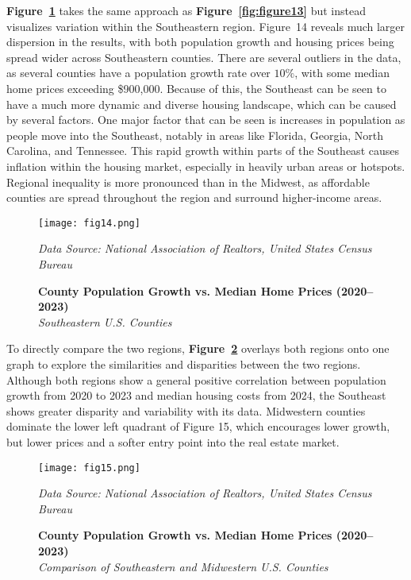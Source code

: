 \documentclass[journal,article,submit,pdftex,moreauthors]{Definitions/mdpi}
\begin{document}
\textbf{Figure~\ref{fig:figure14}} takes the same approach as \textbf{Figure~\ref{fig:figure13}} but instead visualizes variation within the Southeastern region. Figure~14 reveals much larger dispersion in the results, with both population growth and housing prices being spread wider across Southeastern counties. There are several outliers in the data, as several counties have a population growth rate over $10\%$, with some median home prices exceeding \$900{,}000. Because of this, the Southeast can be seen to have a much more dynamic and diverse housing landscape, which can be caused by several factors. One major factor that can be seen is increases in population as people move into the Southeast, notably in areas like Florida, Georgia, North Carolina, and Tennessee. This rapid growth within parts of the Southeast causes inflation within the housing market, especially in heavily urban areas or hotspots. Regional inequality is more pronounced than in the Midwest, as affordable counties are spread throughout the region and surround higher-income areas.

\begin{figure}[H]
  \centering
  \texttt{[image: fig14.png]}
  \caption{\textbf{County Population Growth vs. Median Home Prices (2020–2023)}\\
  \textit{Southeastern U.S. Counties}}
  \label{fig:figure14}
  \vspace{1ex}
  {\footnotesize\textit{Data Source: National Association of Realtors, United States Census Bureau}}
\end{figure}
 
To directly compare the two regions, \textbf{Figure~\ref{fig:figure15}} overlays both regions onto one graph to explore the similarities and disparities between the two regions. Although both regions show a general positive correlation between population growth from 2020 to 2023 and median housing costs from 2024, the Southeast shows greater disparity and variability with its data. Midwestern counties dominate the lower left quadrant of Figure 15, which encourages lower growth, but lower prices and a softer entry point into the real estate market.

\begin{figure}[H]
  \centering
  \texttt{[image: fig15.png]}
  \caption{\textbf{County Population Growth vs. Median Home Prices (2020–2023)}\\
  \textit{Comparison of Southeastern and Midwestern U.S. Counties}}
  \label{fig:figure15}
  \vspace{1ex}
  {\footnotesize\textit{Data Source: National Association of Realtors, United States Census Bureau}}
\end{figure}
\end{document}
